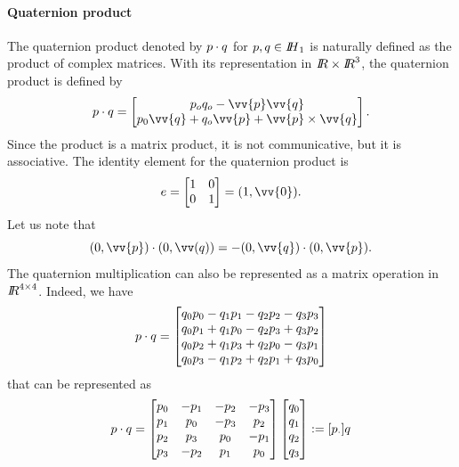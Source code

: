\paragraph{Quaternion product} The quaternion product denoted by $p \cdot q $ for $p,q\in \mbox{\rm $I\!\!H$}_1$ is naturally defined as the product of complex matrices. With its representation in $\mbox{\rm $I\!\!R$}\times \mbox{\rm $I\!\!R$}^3$, the quaternion product is defined by
\begin{equation}
  \label{eq:73}
  p \glaw q =
  \begin{bmatrix}
    p_oq_o - \vv{p}\vv{q} \\
    p_0\vv{q}+q_o\vv{p} + \vv{p}\times\vv{q}
  \end{bmatrix}.
\end{equation}
Since the product is a matrix product, it is not communicative, but it is associative.  The identity element for the quaternion product is
\begin{equation}
e=  \begin{bmatrix}
    1 & 0 \\
    0 & 1  \\
  \end{bmatrix} =(1,\vv{0})\label{eq:57}.
\end{equation}Let us note that
\begin{equation}
  \label{eq:74}
  (0,\vv{p})\glaw (0,\vv(q)) = - (0,\vv{q})\glaw (0,\vv{p}).
\end{equation}
The quaternion multiplication can also be represented as a matrix operation in $\mbox{\rm $I\!\!R$}^{4\times4}$. Indeed, we have
\begin{equation}
  \label{eq:75}
  p \cdot q  =
  \begin{bmatrix}
    q_0 p_0 -q_1p_1-q_2p_2-q_3p_3\\
    q_0 p_1 +q_1p_0-q_2p_3+q_3p_2\\
    q_0 p_2 +q_1p_3+q_2p_0-q_3p_1\\
    q_0 p_3 -q_1p_2+q_2p_1+q_3p_0\\
  \end{bmatrix}
\end{equation}
that can be represented as
\begin{equation}
  \label{eq:76}
  p \cdot q  =
  \begin{bmatrix}
    p_0 & -p_1 & -p_2 & -p_3 \\
    p_1 & p_0 & -p_3 & p_2 \\
    p_2 & p_3 & p_0 & -p_1 \\
    p_3 & -p_2 & p_1 & p_0 \\
  \end{bmatrix}
  \begin{bmatrix}
    q_0\\
    q_1\\
    q_2\\
    q_3
  \end{bmatrix} := [p_\cdot]q
\end{equation}
